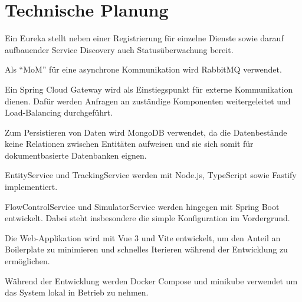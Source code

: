 \section{Technische Planung}

Ein Eureka stellt neben einer Registrierung für einzelne Dienste sowie darauf aufbauender Service Discovery auch Statusüberwachung bereit.

Als \enquote{MoM} für eine asynchrone Kommunikation wird RabbitMQ verwendet.

Ein Spring Cloud Gateway wird als Einstiegspunkt für externe Kommunikation dienen.
Dafür werden Anfragen an zuständige Komponenten weitergeleitet und Load-Balancing durchgeführt.

Zum Persistieren von Daten wird MongoDB verwendet, da die Datenbestände keine Relationen zwischen Entitäten aufweisen und sie sich somit für dokumentbasierte Datenbanken eignen.

EntityService und TrackingService werden mit Node.js, TypeScript sowie Fastify implementiert.

FlowControlService und SimulatorService werden hingegen mit Spring Boot entwickelt.
Dabei steht insbesondere die simple Konfiguration im Vordergrund.

Die Web-Applikation wird mit Vue 3 und Vite entwickelt, um den Anteil an Boilerplate zu minimieren und schnelles Iterieren während der Entwicklung zu ermöglichen.

Während der Entwicklung werden Docker Compose und minikube verwendet um das System lokal in Betrieb zu nehmen.
